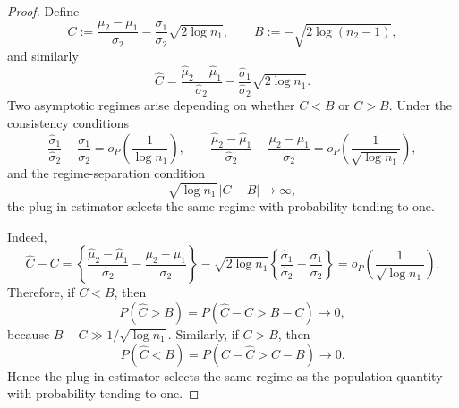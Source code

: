 \documentclass[12pt]{article}
\begin{document}
\begin{proof}


Define
\[
C := \frac{\mu_2-\mu_1}{\sigma_2}
-
\frac{\sigma_1}{\sigma_2}\sqrt{2\log n_1},
\qquad
B := -\sqrt{2\log(n_2-1)},
\]
and similarly
\[
\widehat C =
\frac{\hat\mu_2-\hat\mu_1}{\hat\sigma_2}
-
\frac{\hat\sigma_1}{\hat\sigma_2}\sqrt{2\log n_1}.
\]
Two asymptotic regimes arise depending on whether \(C < B\) or \(C > B\).
Under the consistency conditions
\[
\frac{\hat\sigma_1}{\hat\sigma_2}
-
\frac{\sigma_1}{\sigma_2}
=
o_P\left(\frac{1}{\log n_1}\right),
\qquad
\frac{\hat\mu_2-\hat\mu_1}{\hat\sigma_2}
-
\frac{\mu_2-\mu_1}{\sigma_2}
=
o_P\left(\frac{1}{\sqrt{\log n_1}}\right),
\]
and the regime-separation condition
\[
\sqrt{\log n_1}\,|C-B|\to\infty,
\]
the plug-in estimator selects the same regime with probability tending to one.

Indeed,
\[
\widehat C-C
=
\left\{
\frac{\hat\mu_2-\hat\mu_1}{\hat\sigma_2}
-
\frac{\mu_2-\mu_1}{\sigma_2}
\right\}
-
\sqrt{2\log n_1}
\left\{
\frac{\hat\sigma_1}{\hat\sigma_2}
-
\frac{\sigma_1}{\sigma_2}
\right\}
=
o_P\left(\frac{1}{\sqrt{\log n_1}}\right).
\]
Therefore, if \(C<B\), then
\[
P(\widehat C>B)
=
P(\widehat C-C>B-C)\to 0,
\]
because \(B-C\gg 1/\sqrt{\log n_1}\). Similarly, if \(C>B\), then
\[
P(\widehat C<B)
=
P(C-\widehat C>C-B)\to 0.
\]
Hence the plug-in estimator selects the same regime as the population quantity with probability tending to one.


\end{proof}
\end{document}

